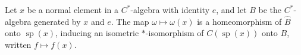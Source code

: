 Let $x$ be a normal element in a $C^*$-algebra with identity $e$, and let $B$ be the $C^*$-algebra generated by $x$ and $e$. The map $\omega \mapsto \omega(x)$ is a homeomorphism of $\hat{B}$ onto $\operatorname{sp}(x)$, inducing an isometric $\ast$-isomorphism of $C(\operatorname{sp}(x))$ onto $B$, written $f \mapsto f(x)$.

